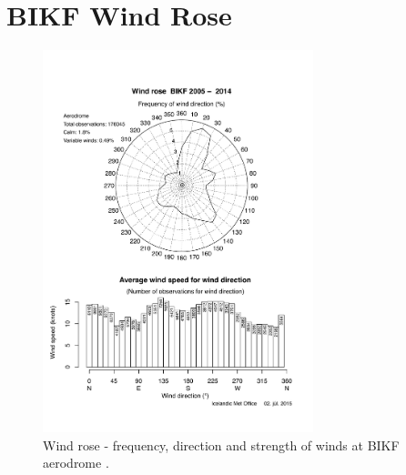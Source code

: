 \clearpage
\chapter{BIKF Wind Rose}\label{app:wind_rose}

\begin{figure}[h]
    \centering
    \includegraphics[width=0.7\textwidth]{graphics/BIKF_windrose_2005-2014.pdf}
    \caption[BIKF Wind Rose]{Wind rose - frequency, direction and strength of winds at BIKF aerodrome \cite{wind_rose_2014}.}
    \label{fig:BIKF_wind_rose}
\end{figure}




